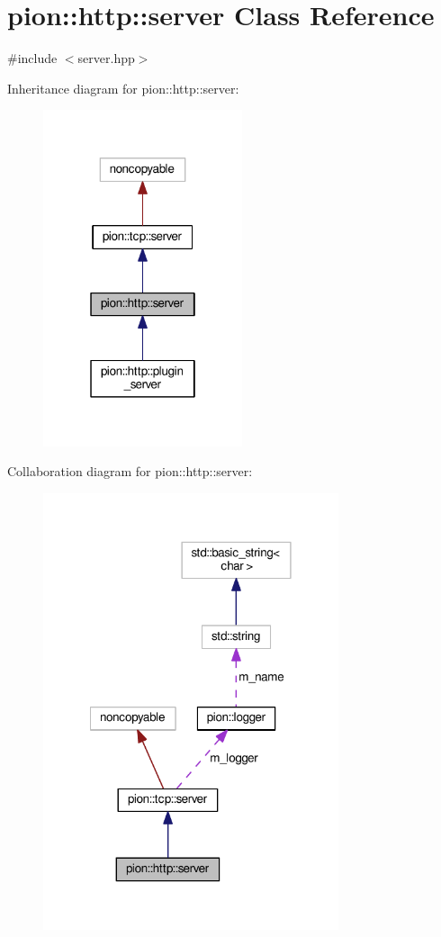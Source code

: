 \hypertarget{classpion_1_1http_1_1server}{\section{pion\-:\-:http\-:\-:server Class Reference}
\label{classpion_1_1http_1_1server}
}


{\ttfamily \#include $<$server.\-hpp$>$}



Inheritance diagram for pion\-:\-:http\-:\-:server\-:
\nopagebreak
\begin{figure}[H]
\begin{center}
\leavevmode
\includegraphics[width=166pt]{classpion_1_1http_1_1server__inherit__graph}
\end{center}
\end{figure}


Collaboration diagram for pion\-:\-:http\-:\-:server\-:
\nopagebreak
\begin{figure}[H]
\begin{center}
\leavevmode
\includegraphics[width=246pt]{classpion_1_1http_1_1server__coll__graph}
\end{center}
\end{figure}
